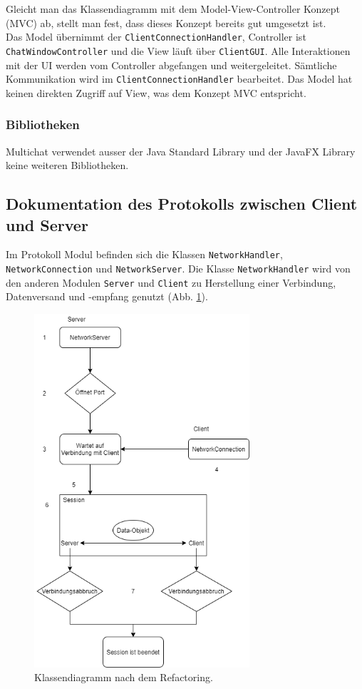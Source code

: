 \documentclass[10pt, hyperref, a4paper]{article}
\begin{document}
Gleicht man das Klassendiagramm mit dem Model-View-Controller Konzept (MVC) ab, stellt man fest, dass dieses Konzept bereits gut umgesetzt ist. \\
Das Model übernimmt der \texttt{ClientConnectionHandler}, Controller ist \texttt{ChatWindowController} und die View läuft über \texttt{ClientGUI}. Alle Interaktionen mit der UI werden vom Controller abgefangen und weitergeleitet. Sämtliche Kommunikation wird im \texttt{ClientConnectionHandler} bearbeitet. Das Model hat keinen direkten Zugriff auf View, was dem Konzept MVC entspricht.

\subsubsection{Bibliotheken}
Multichat verwendet ausser der Java Standard Library und der JavaFX Library keine weiteren Bibliotheken.





\subsection{Dokumentation des Protokolls zwischen Client und Server}

Im Protokoll Modul befinden sich die Klassen \texttt{NetworkHandler}, \texttt{NetworkConnection} und \texttt{NetworkServer}. Die Klasse \texttt{NetworkHandler} wird von den anderen Modulen \texttt{Server} und \texttt{Client} zu Herstellung einer Verbindung, Datenversand und -empfang genutzt (Abb. \ref{fig:protokoll}).\\

	\begin{figure}[bht!]
		\centering
		\includegraphics[width=8cm]{..//protokoll.png}
		\captionsetup{width=8cm}
		\caption{Klassendiagramm nach dem Refactoring.}
		\label{fig:protokoll}
	\end{figure}
\end{document}
